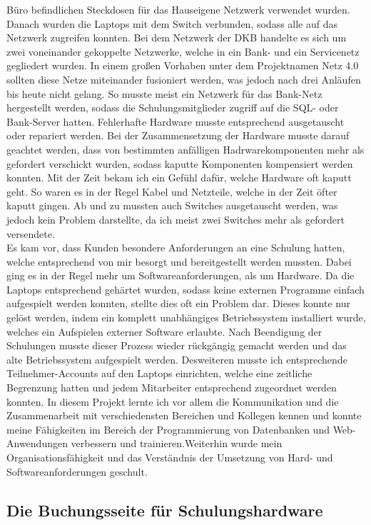 Büro befindlichen Steckdosen für das Hauseigene Netzwerk verwendet wurden. Danach wurden die Laptops mit dem Switch verbunden, sodass alle auf das Netzwerk zugreifen konnten. Bei dem Netzwerk der DKB handelte es sich um zwei voneinander gekoppelte Netzwerke, welche in ein Bank- und ein Servicenetz gegliedert wurden. In einem großen Vorhaben unter dem Projektnamen Netz 4.0 sollten diese Netze miteinander fusioniert werden, was jedoch nach drei Anläufen bis heute nicht gelang. So musste meist ein Netzwerk für das Bank-Netz hergestellt werden, sodass die Schulungsmitglieder zugriff auf die SQL- oder Bank-Server hatten. Fehlerhafte Hardware musste entsprechend ausgetauscht oder repariert werden. Bei der Zusammensetzung der Hardware musste darauf geachtet werden, dass von bestimmten anfälligen Hadrwarekomponenten mehr als gefordert verschickt wurden, sodass kaputte Komponenten kompensiert werden konnten. Mit der Zeit bekam ich ein Gefühl dafür, welche Hardware oft kaputt geht. So waren es in der Regel Kabel und Netzteile, welche in der Zeit öfter kaputt gingen. Ab und zu mussten auch Switches ausgetauscht werden, was jedoch kein Problem darstellte, da ich meist zwei Switches mehr als gefordert versendete. 
\\
Es kam vor, dass Kunden besondere Anforderungen an eine Schulung hatten, welche entsprechend von mir besorgt und bereitgestellt werden mussten. Dabei ging es in der Regel mehr um Softwareanforderungen, als um Hardware. Da die Laptops entsprechend gehärtet wurden, sodass keine externen Programme einfach aufgespielt werden konnten, stellte dies oft ein Problem dar. Dieses konnte nur gelöst werden, indem ein komplett unabhängiges Betriebssystem installiert wurde, welches ein Aufspielen externer Software erlaubte. Nach Beendigung der Schulungen musste dieser Prozess wieder rückgängig gemacht werden und das alte Betriebssystem aufgespielt werden. Desweiteren musste ich entsprechende Teilnehmer-Accounts auf den Laptops einrichten, welche eine zeitliche Begrenzung hatten und jedem Mitarbeiter entsprechend zugeordnet werden konnten.
In diesem Projekt lernte ich vor allem die Kommunikation und die Zusammenarbeit mit verschiedensten Bereichen und Kollegen kennen und konnte meine Fähigkeiten im Bereich der Programmierung von Datenbanken und Web-Anwendungen verbessern und trainieren.Weiterhin wurde mein Organisationsfähigkeit und das Verständnis der Umsetzung von Hard- und Softwareanforderungen geschult. 

\subsection{Die Buchungsseite für Schulungshardware}
\label{Die Buchungsseite für Schulungshardware}

